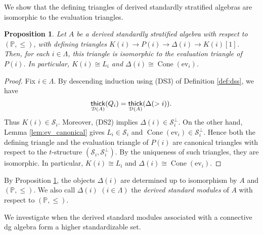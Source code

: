 \documentclass[a4paper,reqno,11pt]{amsart}
\numberwithin{equation}{section}
\newtheorem{proposition}[theorem]{Proposition}
\theoremstyle{definition}
\newcommand{\D}{\mathcal{D}}
\renewcommand{\S}{\mathcal{S}}
\newcommand{\PP}{\mathbb{P}}
\newcommand{\bde}{\Delta}
\newcommand{\ev}{\mathrm{ev}}
\DeclareMathOperator{\Co}{Cone}
\DeclareMathOperator{\thick}{\mathsf{thick}}
\begin{document}
We show that the defining triangles of derived standardly stratified algebras are isomorphic to the evaluation triangles.

\begin{proposition}\label{prop:dss_ev}
Let $A$ be a derived standardly stratified algebra with respect to $(\PP,\leq)$, with defining triangles $K(i)\to P(i)\to\bde(i)\to K(i)[1]$.
Then, for each $i\in\Lambda$, this triangle is isomorphic to the evaluation triangle of $P(i)$.
In particular, $K(i)\cong L_{i}$ and $\bde(i)\cong\Co(\ev_{i})$.
\end{proposition}
\begin{proof}
Fix $i\in\Lambda$.
By descending induction using (DS3) of Definition \ref{def:dss}, we have
\begin{align}
\thick_{\D(A)}(Q_{i})=\thick_{\D(A)}(\bde(>i)).\notag
\end{align}
Thus $K(i)\in\S_{i}$.
Moreover, (DS2) implies $\bde(i)\in\S_{i}^{\perp}$.
On the other hand, Lemma \ref{lem:ev_canonical} gives $L_{i}\in\S_{i}$ and $\Co(\ev_{i})\in\S_{i}^{\perp}$.
Hence both the defining triangle and the evaluation triangle of $P(i)$ are canonical triangles with respect to the $t$-structure $(\S_{i},\S_{i}^{\perp})$.
By the uniqueness of such triangles, they are isomorphic.
In particular, $K(i)\cong L_{i}$ and $\bde(i)\cong\Co(\ev_{i})$.
\end{proof}

By Proposition \ref{prop:dss_ev}, the objects $\bde(i)$ are determined up to isomorphism by $A$ and $(\PP,\leq)$.
We also call $\bde(i)$ $(i\in\Lambda)$ the \emph{derived standard modules} of $A$ with respect to $(\PP,\leq)$.

We investigate when the derived standard modules associated with a connective dg algebra form a higher standardizable set.
\end{document}
